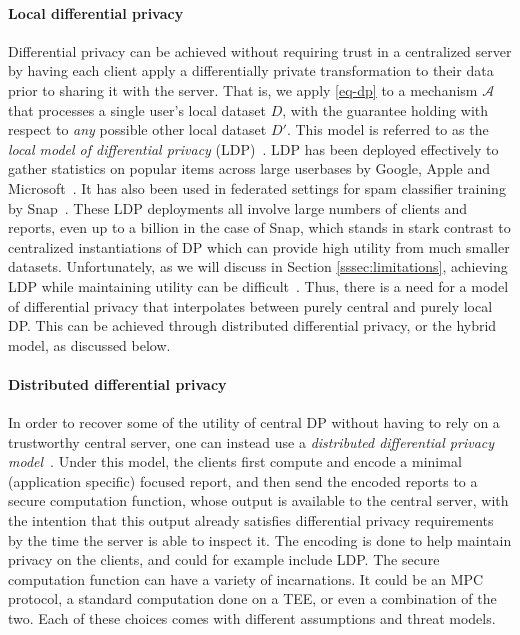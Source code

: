 \paragraph{Local differential privacy} Differential privacy can be achieved without requiring trust in a centralized server by having each client apply a differentially private transformation to their data prior to sharing it with the server. That is, we apply \cref{eq-dp} to a mechanism $\mathcal{A}$ that processes a single user's local dataset $D$, with the guarantee holding with respect to \emph{any} possible other local dataset $D'$.
This model is referred to as the \textit{local model of differential privacy} (LDP)~\cite{Warner65, KLNRS11}. LDP has been deployed effectively to gather statistics on popular items across large userbases by Google, Apple and Microsoft~\cite{rappor:15, applewhitepaper:17,  collecting-telemetry-data-privately}. It has also been used in federated settings for spam classifier training by Snap~\cite{snap}. These LDP deployments all involve large numbers of clients and reports, even up to a billion in the case of Snap, which stands in stark contrast to centralized instantiations of DP which can provide high utility from much smaller datasets. Unfortunately, as we will discuss in Section \ref{sssec:limitations}, achieving LDP while maintaining utility can be difficult~\cite{KLNRS11,Ullman18}. Thus, there is a need for a model of differential privacy that interpolates between purely central and purely local DP. This can be achieved through distributed differential privacy, or the hybrid model, as discussed below.

\paragraph{Distributed differential privacy} In order to recover some of the utility of central DP without having to rely on a trustworthy central server, one can instead use a \emph{distributed differential privacy model}~\cite{dwork2006our, shi2011privacy,prochlo,cheu2019distributed}. Under this model, the clients first compute and encode a minimal (application specific) focused report, and then send the encoded reports to a secure computation function, whose output is available to the central server, with the intention that this output already satisfies differential privacy requirements by the time the server is able to inspect it.  The encoding is done to help maintain privacy on the clients, and could for example include LDP. The secure computation function can have a variety of incarnations. It could be an MPC protocol, a standard computation done on a TEE, or even a combination of the two.  Each of these choices comes with different assumptions and threat models.

